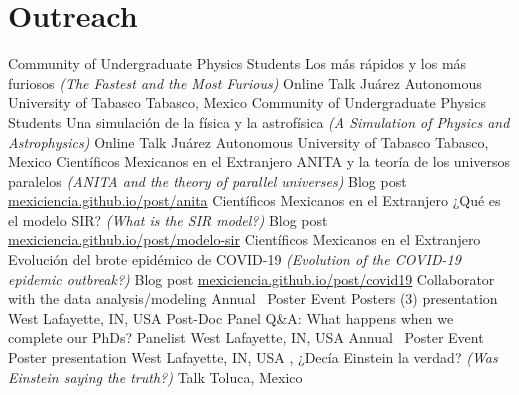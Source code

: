 \section{Outreach}

%
{Community of Undergraduate Physics Students}%
{Los más rápidos y los más furiosos \textnormal{\textit{(The Fastest and the Most Furious)}}}%
{Online Talk}%
{Juárez Autonomous University of Tabasco}%
{Tabasco, Mexico}
%
{Community of Undergraduate Physics Students}%
{Una simulación de la física y la astrofísica \textnormal{\textit{(A Simulation of Physics and Astrophysics)}}}%
{Online Talk}%
{Juárez Autonomous University of Tabasco}%
{Tabasco, Mexico}
%
{Científicos Mexicanos en el Extranjero}%
{ANITA y la teoría de los universos paralelos \textnormal{\textit{(ANITA and the theory of parallel universes)}}}%
{Blog post}%
{\href{https://mexiciencia.github.io/post/anita/}{mexiciencia.github.io/post/anita}}%
{}
%
{Científicos Mexicanos en el Extranjero}%
{¿Qué es el modelo SIR? \textnormal{\textit{(What is the SIR model?)}}}%
{Blog post}%
{\href{https://mexiciencia.github.io/post/modelo-sir/}{mexiciencia.github.io/post/modelo-sir}}%
{}
%
{Científicos Mexicanos en el Extranjero}%
{Evolución del brote epidémico de COVID-19 \textnormal{\textit{(Evolution of the COVID-19 epidemic outbreak?)}}}%
{Blog post}%
{\href{https://mexiciencia.github.io/post/covid19/}{mexiciencia.github.io/post/covid19}}%
{Collaborator with the data analysis/modeling}
%
{\DPA}%
{Annual \DPA\ Poster Event}%
{Posters (3) presentation}%
{\Purdue}%
{West Lafayette, IN, USA}
%
{\DPA}%
{Post-Doc Panel Q\&A: What happens when we complete our PhDs?}%
{Panelist}%
{\Purdue}%
{West Lafayette, IN, USA}
%
{\DPA}%
{Annual \DPA\ Poster Event}%
{Poster presentation}%
{\Purdue}%
{West Lafayette, IN, USA}
%
{\FCes, \UAEMes}%
{¿Decía Einstein la verdad? \textnormal{\textit{(Was Einstein saying the truth?)}}}%
{Talk}%
{}%
{Toluca, Mexico}

